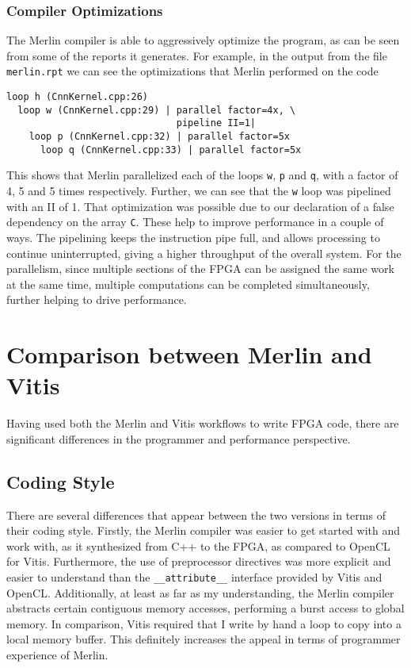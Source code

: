 \documentclass[letterpaper,twocolumn,10pt]{article}
\def\code#1{\texttt{#1}}
\begin{document}
\subsubsection{Compiler Optimizations}
The Merlin compiler is able to aggressively optimize the program, as can be
seen from some of the reports it generates. For example, in the output from
the file \code{merlin.rpt} we can see the optimizations that Merlin performed
on the code
\begin{verbatim}
loop h (CnnKernel.cpp:26) 
  loop w (CnnKernel.cpp:29) | parallel factor=4x, \
                              pipeline II=1|
    loop p (CnnKernel.cpp:32) | parallel factor=5x
      loop q (CnnKernel.cpp:33) | parallel factor=5x 
\end{verbatim}
This shows that Merlin parallelized each of the loops \code{w}, \code{p} and
\code{q}, with a factor of 4, 5 and 5 times respectively. Further, we can see
that the \code{w} loop was pipelined with an II of 1. That optimization was
possible due to our declaration of a false dependency on the array \code{C}.
These help to improve performance in a couple of ways. The pipelining keeps
the instruction pipe full, and allows processing to continue uninterrupted,
giving a higher throughput of the overall system. For the parallelism, since
multiple sections of the FPGA can be assigned the same work at the same time,
multiple computations can be completed simultaneously, further helping to drive
performance. 
\section{Comparison between Merlin and Vitis}
Having used both the Merlin and Vitis workflows to write FPGA code, there are
significant differences in the programmer and performance perspective.
\subsection{Coding Style}
There are several differences that appear between the two versions in terms of
their coding style. Firstly, the Merlin compiler was easier to get started with
and work with, as it synthesized from C++ to the FPGA, as compared to OpenCL
for Vitis. Furthermore, the use of preprocessor directives was more explicit
and easier to understand than the \code{\_\_attribute\_\_} interface provided
by Vitis and OpenCL. Additionally, at least as far as my understanding, the
Merlin compiler abstracts certain contiguous memory accesses, performing a
burst access to global memory. In comparison, Vitis required that I write by
hand a loop to copy into a local memory buffer. This definitely increases the
appeal in terms of programmer experience of Merlin.
\end{document}
